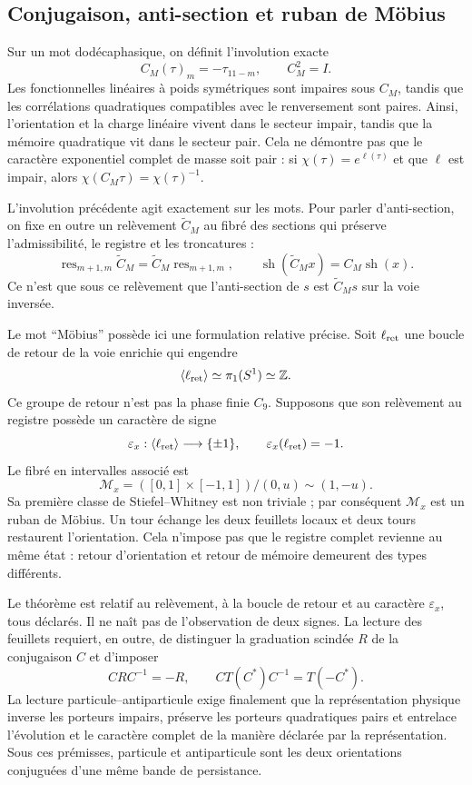 \subsection{Conjugaison, anti-section et ruban de Möbius}

Sur un mot dodécaphasique, on définit l'involution exacte
\[
 C_M(\tau)_m=-\tau_{11-m},
 \qquad C_M^2=I.
\]
Les fonctionnelles linéaires à poids symétriques sont impaires sous \(C_M\),
tandis que les corrélations quadratiques compatibles avec le renversement sont
paires. Ainsi, l'orientation et la charge linéaire vivent dans le secteur impair,
tandis que la mémoire quadratique vit dans le secteur pair. Cela ne démontre pas que
le caractère exponentiel complet de masse soit pair : si
\(\chi(\tau)=e^{\ell(\tau)}\) et que \(\ell\) est impair, alors
\(\chi(C_M\tau)=\chi(\tau)^{-1}\).

L'involution précédente agit exactement sur les mots. Pour parler
d'anti-section, on fixe en outre un relèvement \(\widetilde C_M\) au fibré des
sections qui préserve l'admissibilité, le registre et les troncatures :
\[
 \operatorname{res}_{m+1,m}\widetilde C_M
 =\widetilde C_M\operatorname{res}_{m+1,m},
 \qquad
 \operatorname{sh}(\widetilde C_Mx)=C_M\operatorname{sh}(x).
\]
Ce n'est que sous ce relèvement que l'anti-section de \(s\) est
\(\widetilde C_Ms\) sur la voie inversée.

Le mot ``Möbius'' possède ici une formulation relative précise. Soit
\(\ell_{\rm ret}\) une boucle de retour de la voie enrichie qui engendre
\[
 \langle\ell_{\rm ret}\rangle\simeq\pi_1(S^1)\simeq\mathbb Z.
\]
Ce groupe de retour n'est pas la phase finie \(C_9\). Supposons que son
relèvement au
registre possède un caractère de signe
\[
 \varepsilon_x:\langle\ell_{\rm ret}\rangle\longrightarrow\{\pm1\},
 \qquad \varepsilon_x(\ell_{\rm ret})=-1.
\]
Le fibré en intervalles associé est
\[
 \mathcal M_x=
 ([0,1]\times[-1,1])/(0,u)\sim(1,-u).
\]
Sa première classe de Stiefel--Whitney est non triviale ; par conséquent
\(\mathcal M_x\) est un ruban de Möbius. Un tour échange les deux
feuillets locaux et deux tours restaurent l'orientation. Cela n'impose pas que
le registre complet revienne au même état : retour d'orientation et retour
de mémoire demeurent des types différents.

Le théorème est relatif au relèvement, à la boucle de retour et au caractère
\(\varepsilon_x\), tous déclarés. Il ne naît pas de l'observation de deux signes.
La lecture des feuillets requiert, en outre, de distinguer la graduation scindée \(R\)
de la conjugaison \(C\) et d'imposer
\[
 CRC^{-1}=-R,
 \qquad CT(C^*)C^{-1}=T(-C^*).
\]
La lecture particule--antiparticule exige finalement que la représentation
physique inverse les porteurs impairs, préserve les porteurs quadratiques
pairs et entrelace l'évolution et le caractère complet de la manière déclarée
par la représentation. Sous ces prémisses, particule et antiparticule sont
les deux orientations conjuguées d'une même bande de persistance.

